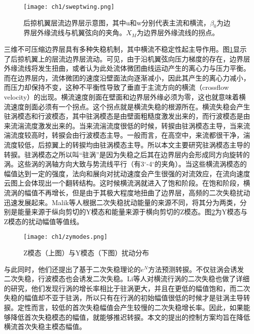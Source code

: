 \begin{figure}
  \centering
  \texttt{[image: ch1/sweptwing.png]}
  \caption{后掠机翼层流边界层示意图\cite{Aranl2000}，其中u和w分别代表主流和横流，$\beta_0$为边界层外缘流线与机翼弦向的夹角。$X_M$为边界层外缘流线的拐点。}\label{f:sweptwing}
\end{figure}


三维不可压缩边界层具有多种失稳机制\cite{Saric2003}，其中横流不稳定性起主导作用。图\ref{f:sweptwing}显示了后掠机翼上的层流边界层流动。可见，由于沿机翼弦向压力梯度的存在，边界层外缘流线将发生扭曲，或者认为此处流体微团曲线运动产生的离心力与压力平衡。而在边界层内，流体微团的速度沿壁面法向逐渐减小，因此其产生的离心力减小，而压力却保持不变，这种不平衡性导致了垂直于主流方向的横流（crossflow velocity）的出现。横流速度剖面在壁面和边界层外缘必须为零，这也就意味着横流速度剖面必须有一个拐点。这个拐点就是横流失稳的根源所在。横流失稳会产生驻涡模态和行波模态，其中驻涡模态是由壁面粗糙度激发出来的，而行波模态是由来流湍流度激发出来的\cite{Schrader2008}。当来流湍流度很低的时候，转捩由驻涡模态主导，当来流湍流度较高时，转捩会由行波模态主导\cite{Bipps1999}。一般而言，在高空中，来流都很干净，湍流度较低，后掠翼上的转捩均由驻涡模态主导。所以本文主要研究驻涡模态主导的转捩。驻涡模态之所以叫“驻涡”是因为失稳之后其在边界层内会形成同方向旋转的涡。这些涡的涡轴方向大致与势流线平行（有3$^\circ$-4$^\circ$的夹角）。当这些横流涡模态的幅值达到一定的强度，法向和展向对扰动速度会产生很强的对流效应，在流向速度云图上会体现出一个翻转结构。这时候横流涡就进入了饱和阶段\cite{Malik1994,Haynes2000}。在饱和阶段，横流涡的幅值不再增长，但是由于其极大程度地扭曲了边界层，高频的二次失稳扰动迅速发展起来\cite{White2005}。Malik等人\cite{Malik1999}根据二次失稳扰动能量的来源不同，将其分为两类，分别是能量来源于纵向剪切的Y模态和能量来源于横向剪切的Z模态。图\ref{f:yzmodes}为Y模态与Z模态的扰动幅值等值线。
\begin{figure}
  \centering
  \texttt{[image: ch1/zymodes.png]}
  \caption{Z模态（上图）与Y模态（下图）扰动分布\cite{Malik1999}}\label{f:yzmodes}
\end{figure}
与此同时，他们还提出了基于二次失稳理论的$e^N$方法预测转捩。不仅驻涡会诱发二次失稳，行波模态也会诱发二次失稳。Li\cite{Li2014}等人对横流行涡的二次失稳也做了详细的研究，他们发现行涡的增长率相比于驻涡更大，并且在更低的幅值饱和，而二次失稳的幅值却不亚于驻涡，所以只有在行涡的初始幅值很低的时候才是驻涡主导转捩。定性而言，较低的首次失稳幅值会产生较慢的二次失稳增长率\cite{Li2015a}。因此，如果能够降低首次失稳模态的幅值，就能够推迟转捩。本文的提出的控制方案均旨在降低横流首次失稳主模态幅值。

